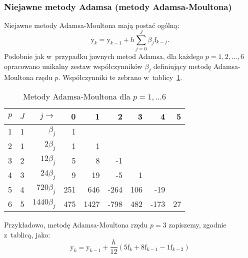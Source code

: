\documentclass[paper=a4,DIV=12]{lpas}
\newcommand{\brm}[1]{\bm{\mathrm{#1}}}
\begin{document}
\begin{appendices}
\subsubsection{Niejawne metody Adamsa (metody Adamsa-Moultona)}
\label{sec:FYDDW}

Niejawne metody Adamsa-Moultona mają postać ogólną:
\begin{equation}
  \brm{y}_k = \brm{y}_{k-1} + h \sum_{j=0}^J \beta_j \brm{f}_{k-j}.
  \label{eq:YCGME}
\end{equation}
Podobnie jak w~przypadku jawnych metod Adamsa, dla każdego $p=1,2,\dots,6$
opracowano unikalny zestaw współczynników $\beta_j$ definiujący metodę
Adamsa-Moultona rzędu $p$. Współczynniki te zebrano w~tablicy~\ref{tab:06769}.
\begin{table}[htbp]
  \caption{Metody Adamsa-Moultona dla $p=1,\dots6$}
  \label{tab:06769}
  \centering
  \begin{tabular}{|c|c|r|r|r|r|r|r|r|}
    \hline
    $p$ & $J$ & $j \rightarrow$ &    0 &    1 &    2 &    3 &    4 &    5 \\ \hline
     1  &  1  &   $\beta_j$     &    1 &      &      &      &      &      \\
     2  &  1  &   $2\beta_j$    &    1 &    1 &      &      &      &      \\
     3  &  2  &  $12\beta_j$    &    5 &    8 &   -1 &      &      &      \\
     4  &  3  &  $24\beta_j$    &    9 &   19 &   -5 &    1 &      &      \\
     5  &  4  & $720\beta_j$    &  251 &  646 & -264 &  106 &  -19 &      \\
     6  &  5  &$1440\beta_j$    &  475 & 1427 & -798 &  482 & -173 &   27 \\ \hline
  \end{tabular}
\end{table}
Przykładowo, metodę Adamsa-Moultona rzędu $p=3$ zapiszemy, zgodnie z~tablicą,
jako:
\begin{equation}
  \brm{y}_k = \brm{y}_{k-1} + \frac{h}{12}\left(
    5 \brm{f}_k + 8 \brm{f}_{k-1} - 1 \brm{f}_{k-2}
  \right)
\end{equation}


\end{appendices}
\end{document}
